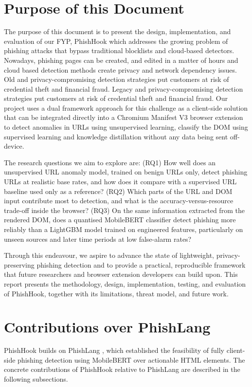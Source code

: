 \documentclass{FastFyp}
\begin{document}
\section{Purpose of this Document}
The purpose of this document is to present the design, implementation, and evaluation of our FYP, PhishHook which addresses the growing problem of phishing attacks that bypass traditional blocklists and cloud-based detectors. Nowadays, phishing pages can be created, and edited in a matter of hours and cloud based detection methods create privacy and network dependency issues. Old and privacy-compromising detection strategies put customers at risk of credential theft and financial fraud. Legacy and privacy-compromising detection strategies put customers at risk of credential theft and financial fraud. Our project uses a dual framework approach for this challenge as a client-side solution that can be integrated directly into a Chromium Manifest V3 browser extension to detect anomalies in URLs using unsupervised learning, classify the DOM using supervised learning and knowledge distillation without any data being sent off-device.

The research questions we aim to explore are: (RQ1) How well does an unsupervised URL anomaly model, trained on benign URLs only, detect phishing URLs at realistic base rates, and how does it compare with a supervised URL baseline used only as a reference? (RQ2) Which parts of the URL and DOM input contribute most to detection, and what is the accuracy-versus-resource trade-off inside the browser? (RQ3) On the same information extracted from the rendered DOM, does a quantised MobileBERT classifier detect phishing more reliably than a LightGBM model trained on engineered features, particularly on unseen sources and later time periods at low false-alarm rates?

Through this endeavour, we aspire to advance the state of lightweight, privacy-preserving phishing detection and to provide a practical, reproducible framework that future researchers and browser extension developers can build upon. This report presents the methodology, design, implementation, testing, and evaluation of PhishHook, together with its limitations, threat model, and future work.  


\section{Contributions over PhishLang}
\label{sec:contributions}
PhishHook builds on PhishLang \cite{phishlang2026}, which established the feasibility of fully client-side phishing detection using MobileBERT over actionable HTML elements. The concrete contributions of PhishHook relative to PhishLang are described in the following subsections.
\end{document}
